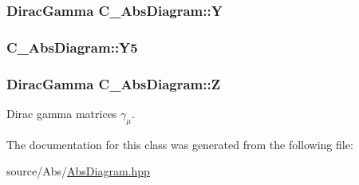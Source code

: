 \hypertarget{class_c___abs_diagram_a4eded4aff0f19920d9ec52e2f5c63abf}{
\subsubsection[{Y}]{\setlength{\rightskip}{0pt plus 5cm}Dirac\-Gamma C\-\_\-\-Abs\-Diagram\-::\-Y\hspace{0.3cm}{\ttfamily [protected]}}}\label{class_c___abs_diagram_a4eded4aff0f19920d9ec52e2f5c63abf}
\hypertarget{class_c___abs_diagram_a49ab5b499fd64c4a196349730d4beda3}{
\subsubsection[{Y5}]{ C\-\_\-\-Abs\-Diagram\-::\-Y5\hspace{0.3cm}{\ttfamily [protected]}}}\label{class_c___abs_diagram_a49ab5b499fd64c4a196349730d4beda3}
\hypertarget{class_c___abs_diagram_a958ffee1be22aa70a0e2eb9fa44f5784}{
\subsubsection[{Z}]{\setlength{\rightskip}{0pt plus 5cm}Dirac\-Gamma C\-\_\-\-Abs\-Diagram\-::\-Z\hspace{0.3cm}{\ttfamily [protected]}}}\label{class_c___abs_diagram_a958ffee1be22aa70a0e2eb9fa44f5784}


Dirac gamma matrices $ \gamma_\mu $. 



The documentation for this class was generated from the following file\-:\begin{DoxyCompactItemize}
\item 
source/\-Abs/\hyperlink{_abs_diagram_8hpp}{Abs\-Diagram.\-hpp}\end{DoxyCompactItemize}
